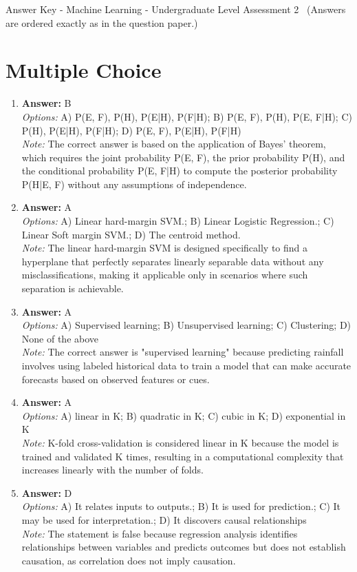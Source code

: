 \documentclass[12pt]{article}
\begin{document}
\begin{center}
Answer Key - Machine Learning - Undergraduate Level Assessment 2 \
\small (Answers are ordered exactly as in the question paper.)
\end{center}

\section*{Multiple Choice}
\begin{enumerate}[label=\arabic*.]
\item \textbf{Answer:} B
\\ \textit{Options:} A) P(E, F), P(H), P(E|H), P(F|H); B) P(E, F), P(H), P(E, F|H); C) P(H), P(E|H), P(F|H); D) P(E, F), P(E|H), P(F|H)
\\ \textit{Note:} The correct answer is based on the application of Bayes' theorem, which requires the joint probability P(E, F), the prior probability P(H), and the conditional probability P(E, F|H) to compute the posterior probability P(H|E, F) without any assumptions of independence.
\item \textbf{Answer:} A
\\ \textit{Options:} A) Linear hard-margin SVM.; B) Linear Logistic Regression.; C) Linear Soft margin SVM.; D) The centroid method.
\\ \textit{Note:} The linear hard-margin SVM is designed specifically to find a hyperplane that perfectly separates linearly separable data without any misclassifications, making it applicable only in scenarios where such separation is achievable.
\item \textbf{Answer:} A
\\ \textit{Options:} A) Supervised learning; B) Unsupervised learning; C) Clustering; D) None of the above
\\ \textit{Note:} The correct answer is "supervised learning" because predicting rainfall involves using labeled historical data to train a model that can make accurate forecasts based on observed features or cues.
\item \textbf{Answer:} A
\\ \textit{Options:} A) linear in K; B) quadratic in K; C) cubic in K; D) exponential in K
\\ \textit{Note:} K-fold cross-validation is considered linear in K because the model is trained and validated K times, resulting in a computational complexity that increases linearly with the number of folds.
\item \textbf{Answer:} D
\\ \textit{Options:} A) It relates inputs to outputs.; B) It is used for prediction.; C) It may be used for interpretation.; D) It discovers causal relationships
\\ \textit{Note:} The statement is false because regression analysis identifies relationships between variables and predicts outcomes but does not establish causation, as correlation does not imply causation.
\end{enumerate}
\end{document}
